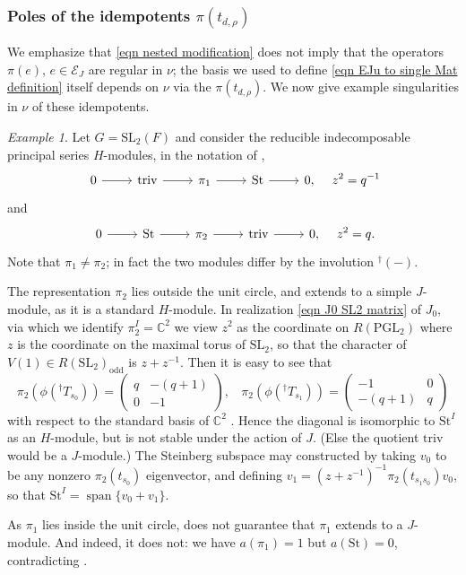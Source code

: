 \documentclass[10pt]{article}
\DeclareMathOperator{\spn}{span}
\newcommand{\Ee}{\mathcal{E}}
\newcommand{\C}{\mathbb{C}}
\newcommand{\PGL}{\mathrm{PGL}}
\newcommand{\SL}{\mathrm{SL}}
\newcommand{\St}{\mathrm{St}}
\newcommand{\triv}{\mathrm{triv}}
\theoremstyle{definition}
\theoremstyle{remark}
\newtheorem{ex}{Example}
\begin{document}
\subsubsection{Poles of the idempotents $\pi(t_{d,\rho})$}
We emphasize that \eqref{eqn nested modification} does not imply that the operators $\pi(e)$, $e\in\Ee_J$ are 
regular in $\nu$; the basis we used to define \eqref{eqn EJu to single Mat definition} itself depends on 
$\nu$ via the $\pi(t_{d,\rho})$. We now give example singularities in $\nu$ of these idempotents.
%
\begin{ex}
\label{ex sl2 rep that is not J-module}
Let $G=\SL_2(F)$ and consider the reducible indecomposable principal series $H$-modules, in the notation 
of \cite[Example 2]{Plancherel},
%
\[
\begin{tikzcd}
0\arrow[r]&\triv\arrow[r]&\pi_1\arrow[r]&\St\arrow[r]&0,
\end{tikzcd}
~~~z^2=q^{-1}
\]
%
and
%
\[
\begin{tikzcd}
0\arrow[r]&\St\arrow[r]&\pi_2\arrow[r]&\triv\arrow[r]&0,
\end{tikzcd}
~~~z^2=q.
\]
%
Note that $\pi_1\neq\pi_2$; in fact the two modules differ by the involution ${}^\dagger(-)$.

The representation $\pi_2$ lies outside the unit circle, and extends to a simple $J$-module, 
as it is a standard $H$-module. In realization \eqref{eqn J0 SL2 matrix} of $J_0$, 
via which we identify $\pi_2^I=\C^2$
we view $z^2$ as the coordinate on $R(\PGL_2)$ where $z$ is the coordinate on the maximal torus of 
$\SL_2$, so that the character of $V(1)\in R(\SL_2)_{\mathrm{odd}}$ is $z+z^{-1}$. Then it is 
easy to see that 
%
\[
\pi_2(\phi({}^\dagger T_{s_0}))=
\begin{pmatrix}
q&-(q+1)\\
0&-1
\end{pmatrix}
,~~~~
\pi_2(\phi({}^\dagger T_{s_1}))=
\begin{pmatrix}
-1&0\\
-(q+1)&q
\end{pmatrix}
\]
%
with respect to the standard basis of $\C^2$ \cite{DSL2}. Hence the diagonal is isomorphic to $\St^I$
as an $H$-module, but is not stable under the action of $J$. (Else the quotient $\triv$ would be a 
$J$-module.)
The Steinberg subspace may constructed by taking $v_0$ to be any nonzero $\pi_2(t_{s_0})$ eigenvector,
and defining $v_1=(z+z^{-1})^{-1}\pi_2(t_{s_1s_0})v_0$, so that $\St^I=\spn\{v_0+v_1\}$.


As $\pi_1$ lies inside the unit circle, \cite[Theorem 2.4]{BK}
does not guarantee that $\pi_1$ extends to a $J$-module. And indeed, it does not:
we have $a(\pi_1)=1$ but $a(\St)=0$, contradicting \cite[Theorem 3.2]{XiJAMS}.
%
\end{ex}
%
\end{document}
